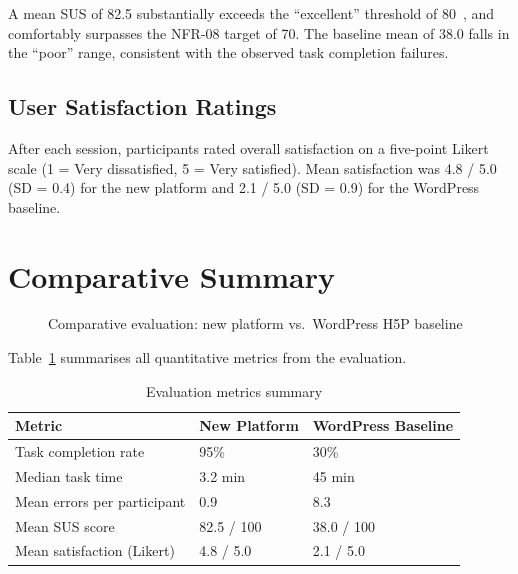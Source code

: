A mean SUS of 82.5 substantially exceeds the ``excellent'' threshold of
80~\cite{brooke1996}, and comfortably surpasses the NFR-08 target of 70.
The baseline mean of 38.0 falls in the ``poor'' range, consistent with the
observed task completion failures.

\subsection{User Satisfaction Ratings}

After each session, participants rated overall satisfaction on a five-point
Likert scale (1 = Very dissatisfied, 5 = Very satisfied). Mean satisfaction
was 4.8 / 5.0 (SD = 0.4) for the new platform and 2.1 / 5.0 (SD = 0.9) for
the WordPress baseline.

\section{Comparative Summary}

\begin{figure}[H]
  \centering
  
  \caption{Comparative evaluation: new platform vs.\ WordPress H5P baseline}
  \label{fig:eval_metrics}
\end{figure}

Table~\ref{tab:summary} summarises all quantitative metrics from the
evaluation.

\begin{table}[H]
  \centering
  \caption{Evaluation metrics summary}
  \label{tab:summary}
  \begin{tabularx}{\linewidth}{Xll}
    \toprule
    \textbf{Metric}             & \textbf{New Platform} & \textbf{WordPress Baseline} \\
    \midrule
    Task completion rate        & 95\%                  & 30\% \\
    Median task time            & 3.2 min               & 45 min \\
    Mean errors per participant & 0.9                   & 8.3 \\
    Mean SUS score              & 82.5 / 100            & 38.0 / 100 \\
    Mean satisfaction (Likert)  & 4.8 / 5.0             & 2.1 / 5.0 \\
    \bottomrule
  \end{tabularx}
\end{table}

